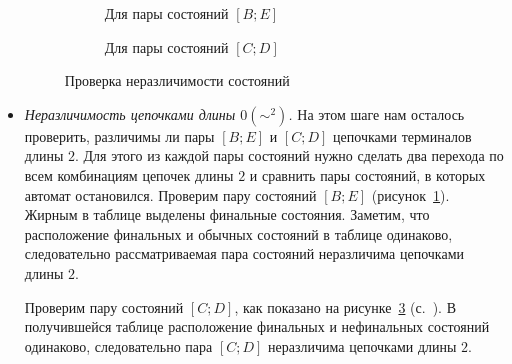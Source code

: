 \begin{myexample}
\begin{itemize}
\begin{figure}[t]
\begin{subfigure}[b]{.5\linewidth}
\centering
{}
\caption{Для пары состояний $[B;E]$}
\label{min-check-1}
\end{subfigure}
%
\begin{subfigure}[b]{.5\linewidth}
\centering
{}
    \caption{Для пары состояний $[C;D]$}
    \label{min-check-2}
\end{subfigure}

\caption{Проверка неразличимости состояний}
\end{figure}

\item \textit{Неразличимость цепочками длины $0 (\sim^2)$.} На этом шаге нам осталось проверить, различимы ли пары  $[B;E]$ и $[C;D]$ цепочками терминалов длины $2$. Для этого из каждой пары состояний нужно сделать два перехода по всем комбинациям цепочек длины $2$ и сравнить пары состояний, в которых автомат остановился. Проверим пару состояний $[B;E]$ (рисунок~\ref{min-check-1}). Жирным в таблице выделены финальные состояния. Заметим, что расположение финальных и обычных состояний в таблице одинаково, следовательно рассматриваемая пара состояний неразличима цепочками длины $2$.

Проверим пару состояний $[C;D]$, как показано на рисунке~\ref{min-check-2} (с.~\pageref{min-check-2}).
В получившейся таблице расположение финальных и нефинальных состояний одинаково, следовательно пара $[C;D]$ неразличима цепочками длины $2$.


\end{itemize}
\end{myexample}
